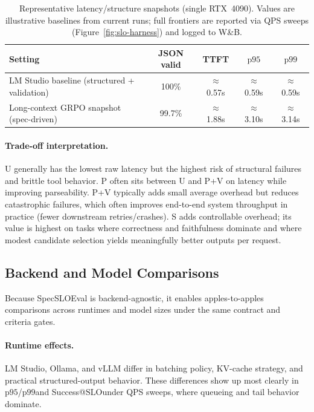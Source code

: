 \documentclass[11pt]{article}
\newcommand{\pninetyfive}{\ensuremath{\mathrm{p95}}}
\newcommand{\pninetynine}{\ensuremath{\mathrm{p99}}}
\newcommand{\slo}{\ensuremath{\mathrm{SLO}}}
\begin{document}
\begin{table}[t]
\centering
\small
\begin{tabular}{@{}lcccc@{}}
\toprule
\textbf{Setting} & \textbf{JSON valid} & \textbf{TTFT} & \textbf{\pninetyfive} & \textbf{\pninetynine} \\
\midrule
LM Studio baseline (structured + validation) & 100\% & $\approx$ 0.57s & $\approx$ 0.59s & $\approx$ 0.59s \\
Long-context GRPO snapshot (spec-driven) & 99.7\% & $\approx$ 1.88s & $\approx$ 3.10s & $\approx$ 3.14s \\
\bottomrule
\end{tabular}
\caption{Representative latency/structure snapshots (single RTX~4090).
Values are illustrative baselines from current runs; full frontiers are reported via QPS sweeps (Figure~\ref{fig:slo-harness}) and logged to W\&B.}
\label{tab:latency-snapshots}
\end{table}

\paragraph{Trade-off interpretation.}
U generally has the lowest raw latency but the highest risk of structural failures and brittle tool behavior.
P often sits between U and P+V on latency while improving parseability.
P+V typically adds small average overhead but reduces catastrophic failures, which often improves end-to-end system throughput in practice (fewer downstream retries/crashes).
S adds controllable overhead; its value is highest on tasks where correctness and faithfulness dominate and where modest candidate selection yields meaningfully better outputs per request.

\subsection{Backend and Model Comparisons}
\label{sec:results-backends}

Because SpecSLOEval is backend-agnostic, it enables apples-to-apples comparisons across runtimes and model sizes under the same contract and criteria gates.

\paragraph{Runtime effects.}
LM Studio, Ollama, and vLLM differ in batching policy, KV-cache strategy, and practical structured-output behavior.
These differences show up most clearly in \pninetyfive/\pninetynine and Success@\slo under QPS sweeps, where queueing and tail behavior dominate.
\end{document}
